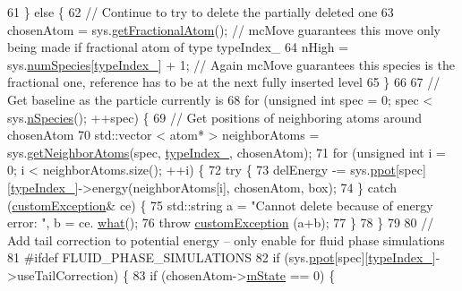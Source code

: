 \begin{DoxyCode}
61     \} \textcolor{keywordflow}{else} \{
62         \textcolor{comment}{// Continue to try to delete the partially deleted one}
63         chosenAtom = sys.\hyperlink{classsim_system_a2ab77377c60e0e3109a6e875690b0ab7}{getFractionalAtom}(); \textcolor{comment}{// mcMove guarantees this move only being
       made if fractional atom of type typeIndex\_}
64         nHigh = sys.\hyperlink{classsim_system_a9eea865e6dc1cff377b1e79c4d9c23f0}{numSpecies}[\hyperlink{classmc_move_acb731965547b0326ef318ec96da8b46a}{typeIndex\_}] + 1; \textcolor{comment}{// Again mcMove guarantees this species
       is the fractional one, reference has to be at the next fully inserted level}
65     \}
66 
67     \textcolor{comment}{// Get baseline as the particle currently is}
68     \textcolor{keywordflow}{for} (\textcolor{keywordtype}{unsigned} \textcolor{keywordtype}{int} spec = 0; spec < sys.\hyperlink{classsim_system_ab5e2e9b6204de15520302fe1d51688dd}{nSpecies}(); ++spec) \{
69         \textcolor{comment}{// Get positions of neighboring atoms around chosenAtom}
70         std::vector < atom* > neighborAtoms = sys.\hyperlink{classsim_system_a9b3aeefa22c3b50b5913df6eea753bc6}{getNeighborAtoms}(spec, 
      \hyperlink{classmc_move_acb731965547b0326ef318ec96da8b46a}{typeIndex\_}, chosenAtom);
71         \textcolor{keywordflow}{for} (\textcolor{keywordtype}{unsigned} \textcolor{keywordtype}{int} i = 0; i < neighborAtoms.size(); ++i) \{
72             \textcolor{keywordflow}{try} \{
73                 delEnergy -= sys.\hyperlink{classsim_system_ad2e290b5963f132e6a3a56cee35c8e9f}{ppot}[spec][\hyperlink{classmc_move_acb731965547b0326ef318ec96da8b46a}{typeIndex\_}]->energy(neighborAtoms[i], chosenAtom,
       box);
74             \} \textcolor{keywordflow}{catch} (\hyperlink{classcustom_exception}{customException}& ce) \{
75                 std::string a = \textcolor{stringliteral}{"Cannot delete because of energy error: "}, b = ce.
      \hyperlink{classcustom_exception_aeb6ab5848b038adfc68fde86a512f691}{what}();
76                 \textcolor{keywordflow}{throw} \hyperlink{classcustom_exception}{customException} (a+b);
77             \}
78         \}
79 
80         \textcolor{comment}{// Add tail correction to potential energy -- only enable for fluid phase simulations}
81 \textcolor{preprocessor}{#ifdef FLUID\_PHASE\_SIMULATIONS}
82 \textcolor{preprocessor}{}        \textcolor{keywordflow}{if} (sys.\hyperlink{classsim_system_ad2e290b5963f132e6a3a56cee35c8e9f}{ppot}[spec][\hyperlink{classmc_move_acb731965547b0326ef318ec96da8b46a}{typeIndex\_}]->useTailCorrection) \{
83             \textcolor{keywordflow}{if} (chosenAtom->\hyperlink{classatom_a3cb00c0c5b7533657e05af6ff4a42740}{mState} == 0) \{

\end{DoxyCode}
